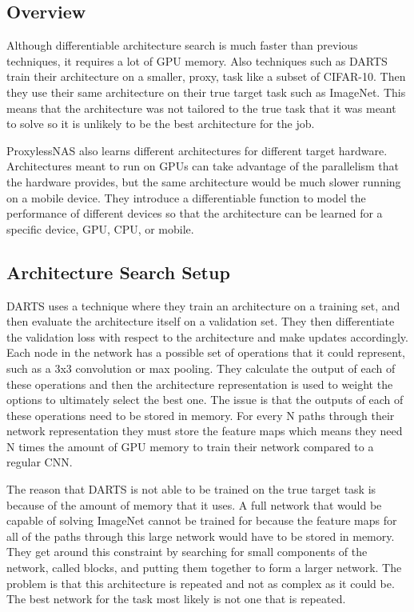 \documentclass{ieee}
\begin{document}
\subsection{Overview}
Although differentiable architecture search is much faster than previous techniques, it requires a lot of GPU memory. Also techniques such as DARTS train their architecture on a smaller, proxy, task like a subset of CIFAR-10. Then they use their same architecture on their true target task such as ImageNet. This means that the architecture was not tailored to the true task that it was meant to solve so it is unlikely to be the best architecture for the job.

ProxylessNAS also learns different architectures for different target hardware. Architectures meant to run on GPUs can take advantage of the parallelism that the hardware provides, but the same architecture would be much slower running on a mobile device. They introduce a differentiable function to model the performance of different devices so that the architecture can be learned for a specific device, GPU, CPU, or mobile. 

\subsection{Architecture Search Setup}
DARTS uses a technique where they train an architecture on a training set, and then evaluate the architecture itself on a validation set. They then differentiate the validation loss with respect to the architecture and make updates accordingly. Each node in the network has a possible set of operations that it could represent, such as a 3x3 convolution or max pooling. They calculate the output of each of these operations and then the architecture representation is used to weight the options to ultimately select the best one. The issue is that the outputs of each of these operations need to be stored in memory. For every N paths through their network representation they must store the feature maps which means they need N times the amount of GPU memory to train their network compared to a regular CNN.

The reason that DARTS is not able to be trained on the true target task is because of the amount of memory that it uses. A full network that would be capable of solving ImageNet cannot be trained for because the feature maps for all of the paths through this large network would have to be stored in memory. They get around this constraint by searching for small components of the network, called blocks, and putting them together to form a larger network. The problem is that this architecture is repeated and not as complex as it could be. The best network for the task most likely is not one that is repeated.
\end{document}
